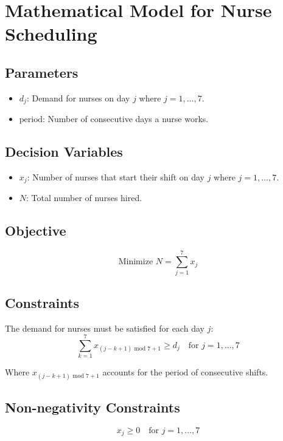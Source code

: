 \documentclass{article}
\begin{document}
\section*{Mathematical Model for Nurse Scheduling}

\subsection*{Parameters}
\begin{itemize}
    \item \( d_j \): Demand for nurses on day \( j \) where \( j = 1, \ldots, 7 \).
    \item \( \text{period} \): Number of consecutive days a nurse works.
\end{itemize}

\subsection*{Decision Variables}
\begin{itemize}
    \item \( x_j \): Number of nurses that start their shift on day \( j \) where \( j = 1, \ldots, 7 \).
    \item \( N \): Total number of nurses hired.
\end{itemize}

\subsection*{Objective}
\[
\text{Minimize } N = \sum_{j=1}^{7} x_j
\]

\subsection*{Constraints}
The demand for nurses must be satisfied for each day \( j \):
\[
\sum_{k=1}^{7} x_{(j-k+1) \text{ mod } 7 + 1} \geq d_j \quad \text{for } j = 1, \ldots, 7
\]

Where \( x_{(j-k+1) \text{ mod } 7 + 1} \) accounts for the \( \text{period} \) of consecutive shifts.

\subsection*{Non-negativity Constraints}
\[
x_j \geq 0 \quad \text{for } j = 1, \ldots, 7
\]
\end{document}
